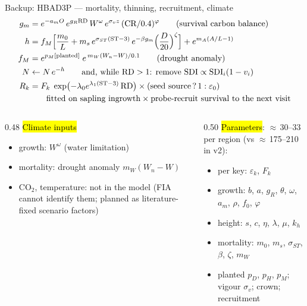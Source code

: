 \begin{frame}{Backup: HBAD3P — mortality, thinning, recruitment, climate}
\footnotesize
\begin{align*}
g_m &= e^{-a_mO}\,e^{g_R\text{RD}}\,W^{\omega}\,e^{\sigma_vz}\,(\text{CR}/0.4)^{\varphi}\qquad\text{(survival carbon balance)}\\
h &= f_M\Bigl[\frac{m_0}{L}+m_s\,e^{\sigma_{ST}(\text{ST}-3)}\,e^{-\beta g_m}\Bigl(\frac{D}{20}\Bigr)^{\zeta}\Bigr]+e^{m_A(A/L-1)}\\
f_M &= e^{p_M[\text{planted}]}\;e^{\,m_W(W_n-W)/0.1}\qquad\text{(drought anomaly)}\\
N &\leftarrow N\,e^{-h} \qquad\text{and, while RD}>1\text{: remove SDI}\propto\text{SDI}_i(1-v_i)\\
R_k &= F_k\;\exp\bigl(-\lambda_0e^{\lambda_1(\text{ST}-3)}\,\text{RD}\bigr)\times(\text{seed source}\,?\,1:\varepsilon_0)\\
&\qquad\text{fitted on sapling ingrowth}\times\text{probe-recruit survival to the next visit}
\end{align*}
\begin{columns}[T]
\begin{column}{0.48\textwidth}
\hl{Climate inputs}
\begin{itemize}\setlength\itemsep{1pt}
\item growth: $W^{\omega}$ (water limitation)
\item mortality: drought anomaly $m_W(W_n-W)$
\item CO$_2$, temperature: not in the model (FIA cannot identify them; planned as literature-fixed scenario factors)
\end{itemize}
\end{column}
\begin{column}{0.50\textwidth}
\hl{Parameters}: $\approx$\,30–33 per region (vs $\approx$\,175–210 in v2):
\begin{itemize}\setlength\itemsep{0pt}
\item per key: $\varepsilon_k$, $F_k$
\item growth: $b$, $a$, $g_R$, $\theta$, $\omega$, $a_m$, $\rho$, $f_0$, $\varphi$
\item height: $s$, $c$, $\eta$, $\lambda$, $\mu$, $k_h$
\item mortality: $m_0$, $m_s$, $\sigma_{ST}$, $\beta$, $\zeta$, $m_W$
\item planted $p_D$, $p_H$, $p_M$; vigour $\sigma_v$; crown; recruitment
\end{itemize}
\end{column}
\end{columns}
\end{frame}

